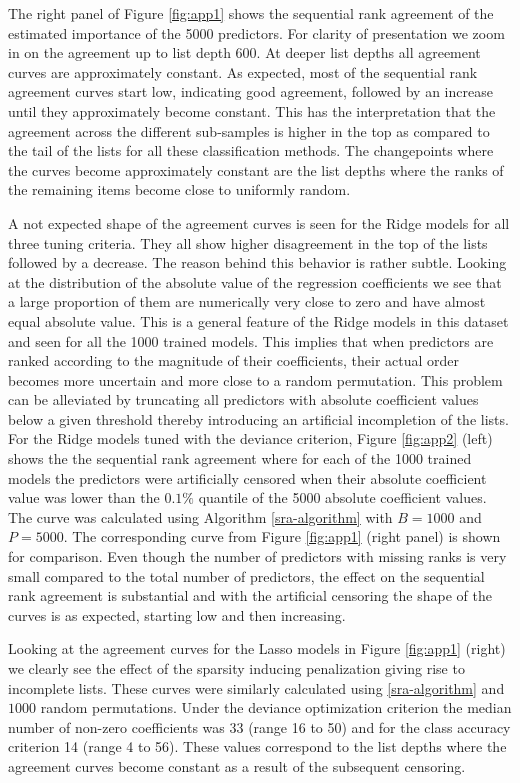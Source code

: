\documentclass[oupdraft]{bio}
\begin{document}
The right panel of Figure \ref{fig:app1} shows the sequential rank
agreement of the estimated importance of the 5000 predictors.  For
clarity of presentation we zoom in on the agreement up to list depth
600. At deeper list depths all agreement curves are approximately constant.
%
As expected, most of the sequential rank agreement curves start low,
indicating good agreement, followed by an increase until they
approximately become constant. This has the interpretation that the
agreement across the different sub-samples is higher in the top as
compared to the tail of the lists for all these classification
methods. The changepoints where the curves become approximately
constant are the list depths where the ranks of the remaining items
become close to uniformly random.

A not expected shape of the agreement curves is seen for the Ridge
models for all three tuning criteria. They all show higher
disagreement in the top of the lists followed by a decrease. The
reason behind this behavior is rather subtle. Looking at the
distribution of the absolute value of the regression coefficients we
see that a large proportion of them are numerically very close to zero
and have almost equal absolute value. This is a general feature of the
Ridge models in this dataset and seen for all the 1000 trained models.
This implies that when predictors are ranked according to the
magnitude of their coefficients, their actual order becomes more
uncertain and more close to a random permutation. This problem can be
alleviated by truncating all predictors with absolute coefficient
values below a given threshold thereby introducing an artificial
incompletion of the lists.  For the Ridge models tuned with the
deviance criterion, Figure \ref{fig:app2} (left) shows the the
sequential rank agreement where for each of the 1000 trained models
the predictors were artificially censored when their absolute
coefficient value was lower than the $0.1\%$ quantile of the 5000
absolute coefficient values. The curve was calculated using Algorithm
\ref{sra-algorithm} with $B=1000$ and $P=5000$. The corresponding
curve from Figure \ref{fig:app1} (right panel) is shown for
comparison.  Even though the number of predictors with missing ranks is very
small compared to the total number of predictors, the effect on the
sequential rank agreement is substantial and with the artificial
censoring the shape of the curves is as expected, starting low and
then increasing. 

Looking at the agreement curves for the Lasso models in Figure
\ref{fig:app1} (right) we clearly see the effect of the sparsity
inducing penalization giving rise to incomplete lists. These curves
were similarly calculated using \ref{sra-algorithm} and $1000$ random
permutations. Under the deviance optimization criterion the median
number of non-zero coefficients was 33 (range 16 to 50) and for the
class accuracy criterion 14 (range 4 to 56). These values correspond
to the list depths where the agreement curves become constant as a
result of the subsequent censoring.
\end{document}
